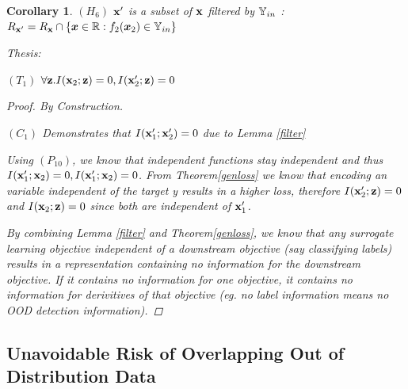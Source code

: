 \documentclass{article} %
\theoremstyle{plain}
\newtheorem{corollary}[theorem]{Corollary}
\theoremstyle{definition}
\theoremstyle{remark}
\begin{document}
\begin{corollary}
$(H_6)$ ${\mathbf{x}}'$ is a subset of ${\mathbf{x}}$ filtered by ${\mathbb{Y}}_{in}$ : $R_{{\mathbf{x}}'} =  R_{{\mathbf{x}}} \cap \{{\bm{x}} \in \mathbb{R}: f_2({\bm{x}}_2) \in {\mathbb{Y}}_{in} \} $

Thesis:

$(T_1)$ $\forall {\mathbf{z}}.I({\mathbf{x}}_2 ; {\mathbf{z}}) = 0, I({\mathbf{x}}_2' ; {\mathbf{z}}) = 0$


\begin{proof} By Construction. 

    $(C_1)$ Demonstrates that $I({\mathbf{x}}_1'; {\mathbf{x}}_2') = 0$ due to Lemma \ref{filter} 

    Using $(P_{10})$, we know that independent functions stay independent and thus $I({\mathbf{x}}_1'; {\mathbf{x}}_2) = 0, I({\mathbf{x}}_1'; {\mathbf{x}}_2) = 0$. From Theorem\ref{genloss} we know that encoding an variable independent of the target y results in a higher loss, therefore $I({\mathbf{x}}_2'; {\mathbf{z}}) = 0$ and $I({\mathbf{x}}_2; {\mathbf{z}}) = 0$ since both are independent of ${\mathbf{x}}_1'$.

    By combining Lemma \ref{filter} and Theorem\ref{genloss}, we know that any surrogate learning objective independent of a downstream objective (say classifying labels) results in a representation containing no information for the downstream objective. If it contains no information for one objective, it contains no information for derivitives of that objective (eg. no label information means no OOD detection information).
    
\end{proof}

\label{failood}

\end{corollary}


\subsection{Unavoidable Risk of Overlapping Out of Distribution Data}

\label{overlaprisk}
\end{document}
